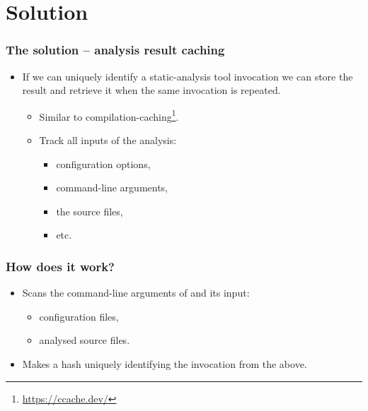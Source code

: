 \documentclass[compress,table,xcolor=table]{beamer}
\begin{document}
\section{Solution}
\begin{frame}
  \Huge
\end{frame}
\begin{frame}
  \frametitle{The solution -- analysis result caching}
    \Large
    \begin{itemize}
    \item If we can uniquely identify a static-analysis tool invocation
        we can store the result and retrieve it when the same invocation
        is repeated.
        \begin{itemize}
        \item Similar to compilation-caching\footnote{
            \url{https://ccache.dev/}}.
        \item Track all inputs of the analysis:
            \begin{itemize}
            \large
            \item configuration options,
            \item command-line arguments,
            \item the source files,
            \item etc.
            \end{itemize}
        \end{itemize}
    \end{itemize}
\end{frame}
\begin{frame}
    \Huge
\end{frame}
\begin{frame}
  \frametitle{How does it work?}
    \LARGE
    \begin{itemize}
        \item Scans the command-line arguments of  and
            its input:
        \begin{itemize}
            \Large
            \item configuration files,
            \item analysed source files.
        \end{itemize}
        \item Makes a hash uniquely identifying the invocation from
            the above.
    \end{itemize}
\end{frame}
\end{document}
